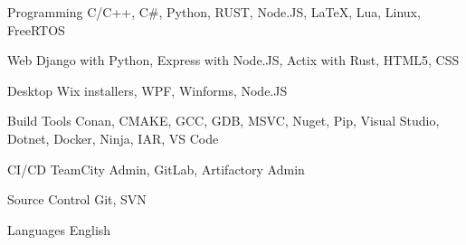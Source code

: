

\begin{cvskills}


\cvskill
{Programming} %
{C/C++, C\#, Python, RUST, Node.JS, LaTeX, Lua, Linux, FreeRTOS} %


\cvskill
{Web} %
{Django with Python, Express with Node.JS, Actix with Rust, HTML5, CSS} %


\cvskill
{Desktop} %
{Wix installers, WPF, Winforms, Node.JS} %


\cvskill
{Build Tools} %
{Conan, CMAKE, GCC, GDB, MSVC, Nuget, Pip, Visual Studio, Dotnet, Docker, Ninja, IAR, VS Code} %


\cvskill
{CI/CD} %
{TeamCity Admin, GitLab, Artifactory Admin} %


\cvskill
{Source Control} %
{Git, SVN} %

\cvskill
{Languages} %
{English} %


\end{cvskills}
